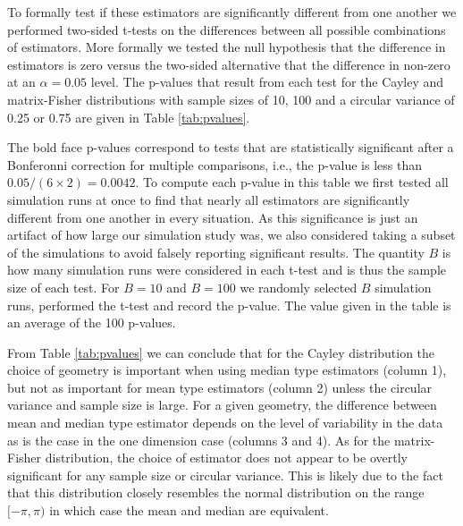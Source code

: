 \documentclass[12pt]{article}
\begin{document}
To formally test if these estimators are significantly different from one another we performed two-sided t-tests on the differences between all possible combinations of estimators.  More formally we tested the null hypothesis that the difference in estimators is zero versus the two-sided alternative that the difference in non-zero at an $\alpha=0.05$ level.  The p-values that result from each test for the Cayley and matrix-Fisher distributions with sample sizes of 10, 100 and a circular variance of 0.25 or 0.75 are given in Table \ref{tab:pvalues}.  

The bold face p-values correspond to tests that are statistically significant after a Bonferonni correction for multiple comparisons, i.e., the p-value is less than $0.05/(6\times 2)=0.0042$.  To compute each p-value in this table we first tested all simulation runs at once to find that nearly all estimators are significantly different from one another in every situation.  As this significance is just an artifact of how large our simulation study was, we also considered taking a subset of the simulations to avoid falsely reporting significant results.  The quantity $B$ is how many simulation runs were considered in each t-test and is thus the sample size of each test.  For $B=10$ and $B=100$ we randomly selected $B$ simulation runs, performed the t-test and record the p-value.  The value given in the table is an average of the 100 p-values.

From Table \ref{tab:pvalues} we can conclude that for the Cayley distribution the choice of geometry is important when using median type estimators (column 1), but not as important for mean type estimators (column 2) unless the circular variance and sample size is large.  For a given geometry, the difference between mean and median type estimator depends on the level of variability in the data as is the case in the one dimension case (columns 3 and 4).  As for the matrix-Fisher distribution, the choice of estimator does not appear to be overtly significant for any sample size or circular variance.  This is likely due to the fact that this distribution closely resembles the normal distribution on the range $[-\pi,\pi)$ in which case the mean and median are equivalent.
\end{document}
